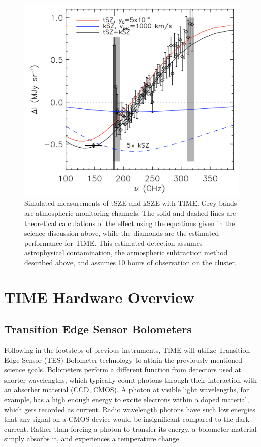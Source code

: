 \documentclass[manuscript]{aastex}
\begin{document}
\vspace{30.0cm}
\hspace*{-0.8cm}
\begin{figure}[H]
\centering
\captionsetup{width=\textwidth}
\includegraphics[width=\textwidth]{time1.png}
\caption[Expected TIME kSZE \& tSZE Measurements]{Simulated measurements of tSZE and kSZE with TIME. Grey bands are atmospheric monitoring channels. The solid and dashed lines are theoretical calculations of the effect using the equations given in the science discussion above, while the diamonds are the estimated performance for TIME. This estimated detection assumes astrophysical contamination, the atmospheric subtraction method described above, and assumes 10 hours of observation on the cluster.}
\label{fig:time1}
\end{figure}

\newpage
\section{\textbf{TIME Hardware Overview}}
\subsection{Transition Edge Sensor Bolometers}
Following in the footsteps of previous instruments, TIME will utilize Transition Edge Sensor (TES) Bolometer technology to attain the previously mentioned science goals. Bolometers perform a different function from detectors used at shorter wavelengths, which typically count photons through their interaction with an absorber material (CCD, CMOS). A photon at visible light wavelengths, for example, has a high enough energy to excite electrons within a doped material, which gets recorded as current. Radio wavelength photons have such low energies that any signal on a CMOS device would be insignificant compared to the dark current. Rather than forcing a photon to transfer its energy, a bolometer material simply absorbs it, and experiences a temperature change.
\end{document}
